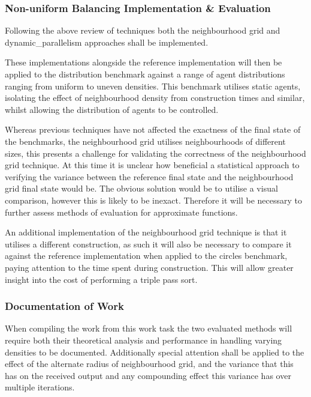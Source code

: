       \subsubsection*{Non-uniform Balancing Implementation \& Evaluation}
        Following the above review of techniques both the neighbourhood grid and \gls{dynamic_parallelism} approaches shall be implemented.
        
        These implementations alongside the reference implementation will then be applied to the distribution benchmark against a range of agent distributions ranging from uniform to uneven densities. This benchmark utilises static agents, isolating the effect of neighbourhood density from construction times and similar, whilst allowing the distribution of agents to be controlled. 
        
        Whereas previous techniques have not affected the exactness of the final state of the benchmarks, the neighbourhood grid utilises neighbourhoods of different sizes, this presents a challenge for validating the correctness of the neighbourhood grid technique. At this time it is unclear how beneficial a statistical approach to verifying the variance between the reference final state and the neighbourhood grid final state would be. The obvious solution would be to utilise a visual comparison, however this is likely to be inexact. Therefore it will be necessary to further assess methods of evaluation for approximate functions.
        
        An additional implementation of the neighbourhood grid technique is that it utilises a different construction, as such it will also be necessary to compare it against the reference implementation when applied to the circles benchmark, paying attention to the time spent during construction. This will allow greater insight into the cost of performing a triple pass sort.
        
      \subsubsection*{Documentation of Work}
        When compiling the work from this work task the two evaluated methods will require both their theoretical analysis and performance in handling varying densities to be documented. Additionally special attention shall be applied to the effect of the alternate radius of neighbourhood grid, and the variance that this has on the received output and any compounding effect this variance has over multiple iterations. 
        
